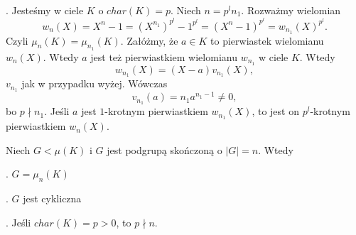 . Jesteśmy w ciele $K$ o $char(K)=p$. Niech $n=p^ln_1$. Rozważmy wielomian
$$w_n(X)=X^n-1=(X^{n_1})^{p^l}-1^{p^l}=(X^n-1)^{p^l}=w_{n_1}(X)^{p^l}.$$
Czyli $\mu_n(K)=\mu_{n_1}(K)$. Załóżmy, że $a\in K$ to pierwiastek wielomianu $w_n(X)$. Wtedy $a$ jest też pierwiastkiem wielomianu $w_{n_1}$ w ciele $K$. Wtedy
$$w_{n_1}(X)=(X-a)v_{n_1}(X),$$
$v_{n_1}$ jak w przypadku wyżej. Wówczas
$$v_{n_1}(a)=n_1a^{n_1-1}\neq0,$$
bo $p\nmid n_1$. 
Jeśli $a$ jest $1$-krotnym pierwiastkiem $w_{n_1}(X)$, to jest on $p^l$-krotnym pierwiastkiem $w_n(X)$.



\begin{theorem}
    Niech $G<\mu(K)$ i $G$ jest podgrupą skończoną o $|G|=n$. Wtedy

. $G=\mu_n(K)$

. $G$ jest cykliczna

. Jeśli $char(K)=p>0$, to $p\nmid n$.
\end{theorem}

